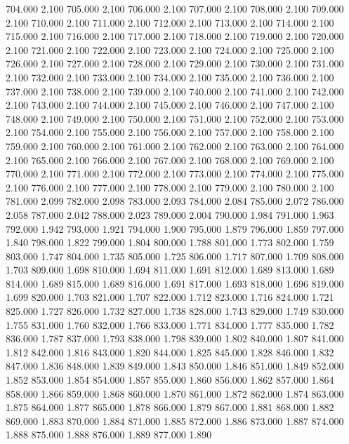 704.000 2.100 
705.000 2.100 
706.000 2.100 
707.000 2.100 
708.000 2.100 
709.000 2.100 
710.000 2.100 
711.000 2.100 
712.000 2.100 
713.000 2.100 
714.000 2.100 
715.000 2.100 
716.000 2.100 
717.000 2.100 
718.000 2.100 
719.000 2.100 
720.000 2.100 
721.000 2.100 
722.000 2.100 
723.000 2.100 
724.000 2.100 
725.000 2.100 
726.000 2.100 
727.000 2.100 
728.000 2.100 
729.000 2.100 
730.000 2.100 
731.000 2.100 
732.000 2.100 
733.000 2.100 
734.000 2.100 
735.000 2.100 
736.000 2.100 
737.000 2.100 
738.000 2.100 
739.000 2.100 
740.000 2.100 
741.000 2.100 
742.000 2.100 
743.000 2.100 
744.000 2.100 
745.000 2.100 
746.000 2.100 
747.000 2.100 
748.000 2.100 
749.000 2.100 
750.000 2.100 
751.000 2.100 
752.000 2.100 
753.000 2.100 
754.000 2.100 
755.000 2.100 
756.000 2.100 
757.000 2.100 
758.000 2.100 
759.000 2.100 
760.000 2.100 
761.000 2.100 
762.000 2.100 
763.000 2.100 
764.000 2.100 
765.000 2.100 
766.000 2.100 
767.000 2.100 
768.000 2.100 
769.000 2.100 
770.000 2.100 
771.000 2.100 
772.000 2.100 
773.000 2.100 
774.000 2.100 
775.000 2.100 
776.000 2.100 
777.000 2.100 
778.000 2.100 
779.000 2.100 
780.000 2.100 
781.000 2.099 
782.000 2.098 
783.000 2.093 
784.000 2.084 
785.000 2.072 
786.000 2.058 
787.000 2.042 
788.000 2.023 
789.000 2.004 
790.000 1.984 
791.000 1.963 
792.000 1.942 
793.000 1.921 
794.000 1.900 
795.000 1.879 
796.000 1.859 
797.000 1.840 
798.000 1.822 
799.000 1.804 
800.000 1.788 
801.000 1.773 
802.000 1.759 
803.000 1.747 
804.000 1.735 
805.000 1.725 
806.000 1.717 
807.000 1.709 
808.000 1.703 
809.000 1.698 
810.000 1.694 
811.000 1.691 
812.000 1.689 
813.000 1.689 
814.000 1.689 
815.000 1.689 
816.000 1.691 
817.000 1.693 
818.000 1.696 
819.000 1.699 
820.000 1.703 
821.000 1.707 
822.000 1.712 
823.000 1.716 
824.000 1.721 
825.000 1.727 
826.000 1.732 
827.000 1.738 
828.000 1.743 
829.000 1.749 
830.000 1.755 
831.000 1.760 
832.000 1.766 
833.000 1.771 
834.000 1.777 
835.000 1.782 
836.000 1.787 
837.000 1.793 
838.000 1.798 
839.000 1.802 
840.000 1.807 
841.000 1.812 
842.000 1.816 
843.000 1.820 
844.000 1.825 
845.000 1.828 
846.000 1.832 
847.000 1.836 
848.000 1.839 
849.000 1.843 
850.000 1.846 
851.000 1.849 
852.000 1.852 
853.000 1.854 
854.000 1.857 
855.000 1.860 
856.000 1.862 
857.000 1.864 
858.000 1.866 
859.000 1.868 
860.000 1.870 
861.000 1.872 
862.000 1.874 
863.000 1.875 
864.000 1.877 
865.000 1.878 
866.000 1.879 
867.000 1.881 
868.000 1.882 
869.000 1.883 
870.000 1.884 
871.000 1.885 
872.000 1.886 
873.000 1.887 
874.000 1.888 
875.000 1.888 
876.000 1.889 
877.000 1.890 
